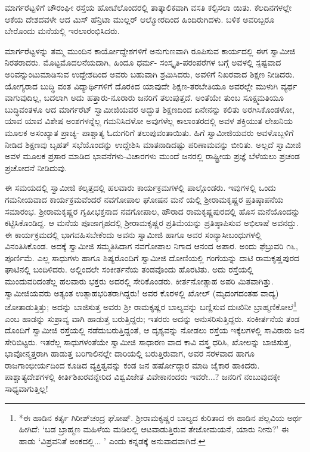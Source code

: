 ಮಾರ್ಗರೆಟ್ಟಳಿಗೆ ಚೌರಂಘೀ ರಸ್ತೆಯ ಹೋಟೆಲೊಂದರಲ್ಲಿ ತಾತ್ಕಾಲಿಕವಾಗಿ ವಸತಿ ಕಲ್ಪಿಸಲಾ ಯಿತು. ಕೆಲದಿನಗಳಲ್ಲೇ ಆಕೆಯ ದೇಶದವಳೇ ಆದ ಮಿಸ್ ಹೆನ್ರಿಟಾ ಮುಲ್ಲರ್ ಆಲ್ಮೋರದಿಂದ ಹಿಂದಿರುಗಿದಳು. ಬಳಿಕ ಅವರಿಬ್ಬರೂ ಬೇರೊಂದು ಮನೆಯಲ್ಲಿ ಇರಲಾರಂಭಿಸಿದರು.

ಮಾರ್ಗರೆಟ್ಟಳನ್ನು ತಮ್ಮ ಮುಂದಿನ ಕಾರ್ಯೋದ್ದೇಶಗಳಿಗೆ ಅನುಗುಣವಾಗಿ ರೂಪಿಸುವ ಕಾರ್ಯದಲ್ಲಿ ಈಗ ಸ್ವಾಮೀಜಿ ನಿರತರಾದರು. ಮೊಟ್ಟಮೊದಲನೆಯದಾಗಿ, ಹಿಂದೂ ಧರ್ಮ- ಸಂಸ್ಕೃತಿ-ಪರಂಪರೆಗಳ ಬಗ್ಗೆ ಅವಳಲ್ಲಿ ಸ್ಪಷ್ಟವಾದ ಅರಿವನ್ನುಂಟುಮಾಡಿಸುವ ಉದ್ದೇಶದಿಂದ ಅವರು ಬಹುವಾಗಿ ಶ್ರಮಿಸಿದರು, ಅವಳಿಗೆ ನಿಖರವಾದ ಶಿಕ್ಷಣ ನೀಡಿದರು. ಯೋಗ್ಯರಾದ ಬುದ್ಧಿ ವಂತ ವಿದ್ಯಾರ್ಥಿಗಳಿಗೆ ದೊರಕಿದ ಯಾವುದೇ ಶಿಕ್ಷಣ-ತರಬೇತಿಯೂ ಅವರಲ್ಲೇ ಮುಳುಗಿ ವ್ಯರ್ಥ ವಾಗುವುದಿಲ್ಲ, ಬದಲಾಗಿ ಅದು ಹತ್ತಾರು-ನೂರಾರು ಜನರಿಗೆ ತಲುಪುತ್ತದೆ. ಅಂತೆಯೇ ತುಂಬ ಸೂಕ್ಷ್ಮಮತಿಯೂ ಬುದ್ಧಿವಂತಳೂ ಆದ ಮಾರ್ಗರೆಟ್ ಸ್ವಾಮೀಜಿಯವರ ಅದ್ಭುತ ಶಿಕ್ಷಣದಿಂದ ಏನೇನನ್ನು ಕಲಿತು ಅರಗಿಸಿಕೊಂಡಳೋ, ಯಾವ ಯಾವ ವಿಶೇಷ ಅಂಶಗಳನ್ನೆಲ್ಲ ಗಮನಿಸಿದಳೋ ಅವುಗಳೆಲ್ಲ ಕಾಲಾಂತರದಲ್ಲಿ ಅವಳ ಶಕ್ತಿಯುತ ಲೇಖನಿಯ ಮೂಲಕ ಅಸಂಖ್ಯಾತ ಪ್ರಾಚ್ಯ- ಪಾಶ್ಚಾತ್ಯ ಓದುಗರಿಗೆ ತಲುಪುವಂತಾಯಿತು. ಹಿಗೆ ಸ್ವಾಮೀಜಿಯವರು ಅವಳೊಬ್ಬಳಿಗೆ ನೀಡಿದ ಶಿಕ್ಷಣವು ಬೃಹತ್ ಸಭೆಯೊಂದನ್ನು ಉದ್ದೇಶಿಸಿ ಮಾತನಾಡಿದಷ್ಟು ಪರಿಣಾಮವನ್ನು ಬೀರಿತು. ಅಲ್ಲದೆ ಸ್ವಾಮೀಜಿ ಅವಳ ಮೂಲಕ ಪ್ರಸಾರ ಮಾಡಿದ ಭಾವನೆಗಳು-ವಿಚಾರಗಳು ಮುಂದೆ ಜನರಲ್ಲಿ ರಾಷ್ಟ್ರೀಯ ಪ್ರಜ್ಞೆ ಬೆಳೆಯಲು ಪ್ರಚಂಡ ಪ್ರಚೋದನೆ ನೀಡಿದುವು.

ಈ ಸಮಯದಲ್ಲಿ ಸ್ವಾಮೀಜಿ ಕಲ್ಕತ್ತದಲ್ಲಿ ಹಲವಾರು ಕಾರ್ಯಕ್ರಮಗಳಲ್ಲಿ ಪಾಲ್ಗೊಂಡರು. ಇವುಗಳಲ್ಲಿ ಒಂದು ಗಮನೀಯವಾದ ಕಾರ್ಯಕ್ರಮವೆಂದರೆ ನವಗೋಪಾಲ ಘೋಷನ ಮನೆ ಯಲ್ಲಿ ಶ್ರೀರಾಮಕೃಷ್ಣರ ಪ್ರತಿಷ್ಠಾಪನೆಯ ಸಮಾರಂಭ. ಶ್ರೀರಾಮಕೃಷ್ಣರ ಗೃಹೀಭಕ್ತನಾದ ನವಗೋಪಾಲ, ಹೌರಾದ ರಾಮಕೃಷ್ಣಪುರದಲ್ಲಿ ಹೊಸ ಮನೆಯೊಂದನ್ನು ಕಟ್ಟಿಸಿಕೊಂಡಿದ್ದ. ಆ ಮನೆಯ ಪೂಜಾಗೃಹದಲ್ಲಿ ಶ್ರೀರಾಮಕೃಷ್ಣರ ಪ್ರತಿಮೆಯನ್ನು ಪ್ರತಿಷ್ಠಾಪಿಸುವ ಅಭಿಲಾಷೆ ಅವನದ್ದು. ಈ ಕಾರ್ಯಕ್ರಮದಲ್ಲಿ ಭಾಗವಹಿಸಬೇಕೆಂದು ಅವನು ಸ್ವಾಮೀಜಿ ಹಾಗೂ ಅವರ ಸಂನ್ಯಾಸೀಬಂಧುಗಳಲ್ಲಿ ವಿನಂತಿಸಿಕೊಂಡ. ಅದಕ್ಕೆ ಸ್ವಾಮೀಜಿ ಸಮ್ಮತಿಸಿದಾಗ ನವಗೋಪಾಲ ನಿಗಾದ ಆನಂದ ಅಪಾರ. ಅಂದು ಫೆಬ್ರುವರಿ ೧೬, ಪೂರ್ಣಿಮೆ. ಎಲ್ಲ ಸಾಧುಗಳು ಹಾಗೂ ಶಿಷ್ಯರೊಂದಿಗೆ ಸ್ವಾಮೀಜಿ ದೋಣಿಯಲ್ಲಿ ಗಂಗೆಯನ್ನು ದಾಟಿ ರಾಮಕೃಷ್ಣಪುರದ ಘಾಟಿನಲ್ಲಿ ಬಂದಿಳಿದರು. ಅಲ್ಲಿಂದಲೇ ಸಂಕೀರ್ತನೆಯ ತಂಡವೊಂದು ಹೊರಟಿತು. ಅದು ರಸ್ತೆಯಲ್ಲಿ ಮುಂದುವರಿದಂತೆಲ್ಲ ಹಲವಾರು ಭಕ್ತರು ಅದರಲ್ಲಿ ಸೇರಿಕೊಂಡರು. ಕೀರ್ತನೋತ್ಸಾಹ ಅಪರಿ ಮಿತವಾಗಿತ್ತು. ಸ್ವಾಮೀಜಿಯವರು ಅತ್ಯಂತ ಉತ್ಸಾಹಭರಿತರಾಗಿದ್ದರು! ಅವರ ಕೊರಳಲ್ಲಿ ಖೋಲ್ (ಮೃದಂಗದಂತಹ ವಾದ್ಯ) ಜೋತಾಡುತ್ತಿತ್ತು; ಅದನ್ನು ಬಾಜಿಸುತ್ತ ಅವರು ಶ್ರೀ ರಾಮಕೃಷ್ಣರ ಬಾಲ್ಯವನ್ನು ಬಣ್ಣಿಸುವ ದುಃಖಿನೀ ಬ್ರಾಹ್ಮಣಿಕೋಲೆ\footnote{*ಈ ಹಾಡಿನ ಕರ್ತೃ ಗಿರೀಶ್​ಚಂದ್ರ ಘೋಷ್. ಶ್ರೀರಾಮಕೃಷ್ಣರ ಬಾಲ್ಯದ ಕುರಿತಾದ ಈ ಹಾಡಿನ ಪಲ್ಲವಿಯ ಅರ್ಥ ಹೀಗಿದೆ: ‘ಬಡ ಬ್ರಾಹ್ಮಣ ಮಹಿಳೆಯ ಮಡಿಲಲ್ಲಿ ಆಟವಾಡುತ್ತಿರುವ ತೇಜೋಮಯನೆ, ಯಾರು ನೀನು?’ ಈ ಹಾಡು ‘ವಿಪ್ರವನಿತೆ ಅಂಕದಲ್ಲಿ... ’ ಎಂದು ಕನ್ನಡಕ್ಕೆ ಅನುವಾದವಾಗಿದೆ.} ಎಂಬ ಹಾಡನ್ನು ಸುಶ್ರಾವ್ಯ ವಾಗಿ ಹಾಡುತ್ತ ಬರುತ್ತಿದ್ದರು; ಇತರರು ಅದನ್ನು ಅನುಸರಿಸುತ್ತಿದ್ದರು. ಸಂಕೀರ್ತನೆಯ ತಂಡ ದೊಂದಿಗೆ ಸ್ವಾಮೀಜಿ ರಸ್ತೆಯಲ್ಲಿ ನಡೆದುಬರುತ್ತಿದ್ದಂತೆ, ಆ ದೃಶ್ಯವನ್ನು ನೋಡಲು ರಸ್ತೆಯ ಇಕ್ಕೆಲಗಳಲ್ಲಿ ಸಾವಿರಾರು ಜನ ಸೇರಿಬಿಟ್ಟರು. ಇತರೆಲ್ಲ ಸಾಧುಗಳಂತೆಯೇ ಸ್ವಾಮೀಜಿ ಸಾಧಾರಣ ವಾದ ಕಾವಿ ವಸ್ತ್ರ ಧರಿಸಿ, ಖೋಲನ್ನು ಬಾಜಿಸುತ್ತ, ಭಾವೋನ್ಮತ್ತರಾಗಿ ಹಾಡುತ್ತ ಬರಿಗಾಲಿನಲ್ಲೇ ದಾರಿಯಲ್ಲಿ ಬರುತ್ತಿರುವಾಗ, ಅವರ ಸರಳವಾದ ಹಾಗೂ ರಾಜಗಾಂಭೀರ್ಯದಿಂದ ಕೂಡಿದ ವ್ಯಕ್ತಿತ್ವವನ್ನು ಕಂಡ ಜನ ಹರ್ಷೋದ್ಗಾರ ಮಾಡಿ ಜೈಕಾರ ಹಾಕಿದರು. ಪಾಶ್ಚಾತ್ಯದೇಶಗಳಲ್ಲಿ ಕೀರ್ತಿಶಿಖರವನ್ನೇರಿದ ವಿಶ್ವವಿಜೇತ ವಿವೇಕಾನಂದರು ಇವರೇ...? ಜನರಿಗೆ ನಂಬುವುದಕ್ಕೇ ಸಾಧ್ಯವಾಗುತ್ತಿಲ್ಲ!

